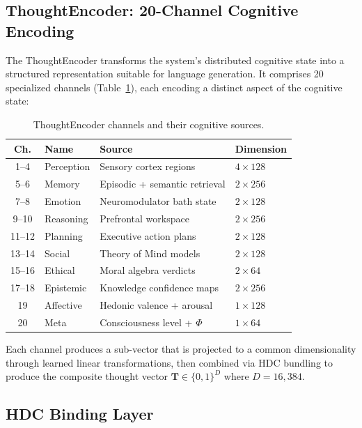 \documentclass[12pt,a4paper]{article}
\begin{document}
\subsection{ThoughtEncoder: 20-Channel Cognitive Encoding}

The ThoughtEncoder transforms the system's distributed cognitive state into a structured representation suitable for language generation. It comprises 20 specialized channels (Table~\ref{tab:channels}), each encoding a distinct aspect of the cognitive state:

\begin{table}[H]
\centering
\caption{ThoughtEncoder channels and their cognitive sources.}
\label{tab:channels}
\begin{tabular}{clll}
\toprule
\textbf{Ch.} & \textbf{Name} & \textbf{Source} & \textbf{Dimension} \\
\midrule
1--4 & Perception & Sensory cortex regions & $4 \times 128$ \\
5--6 & Memory & Episodic + semantic retrieval & $2 \times 256$ \\
7--8 & Emotion & Neuromodulator bath state & $2 \times 128$ \\
9--10 & Reasoning & Prefrontal workspace & $2 \times 256$ \\
11--12 & Planning & Executive action plans & $2 \times 128$ \\
13--14 & Social & Theory of Mind models & $2 \times 128$ \\
15--16 & Ethical & Moral algebra verdicts & $2 \times 64$ \\
17--18 & Epistemic & Knowledge confidence maps & $2 \times 256$ \\
19 & Affective & Hedonic valence + arousal & $1 \times 128$ \\
20 & Meta & Consciousness level + $\Phi$ & $1 \times 64$ \\
\bottomrule
\end{tabular}
\end{table}

Each channel produces a sub-vector that is projected to a common dimensionality through learned linear transformations, then combined via HDC bundling to produce the composite thought vector $\mathbf{T} \in \{0,1\}^{D}$ where $D = 16{,}384$.

\subsection{HDC Binding Layer}
\end{document}
